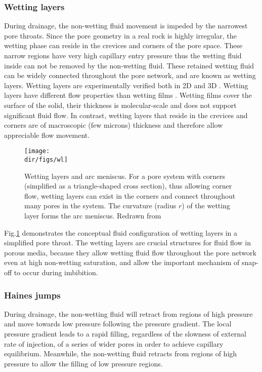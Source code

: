 \subsubsection{Wetting layers}
During drainage, the non-wetting fluid movement is impeded by the narrowest pore throats. Since the pore geometry in a real rock is highly irregular, the wetting phase can reside in the crevices and corners of the pore space. These narrow regions have very high capillary entry pressure thus the wetting fluid inside can not be removed by the non-wetting fluid. These retained wetting fluid can be widely connected throughout the pore network, and are known as wetting layers. Wetting layers are experimentally verified both in 2D and 3D \citep{datta2014mobilization, andrew2015imaging}. Wetting layers have different flow properties than wetting films \citep{blunt2017multiphase}. Wetting films cover the surface of the solid, their thickness is molecular-scale and does not support significant fluid flow. In contrast, wetting layers that reside in the crevices and corners are of macroscopic (few microns) thickness and therefore allow appreciable flow movement.

\begin{figure}[htbp]
  \centering
  \texttt{[image: \\dir/figs/wl]}
  \caption{Wetting layers and arc meniscus. For a pore system with corners (simplified as a triangle-shaped cross section), thus allowing corner flow, wetting layers can exist in the corners and connect throughout many pores in the system. The curvature (radius $r$) of the wetting layer forms the arc meniscus. Redrawn from \citet{blunt2017multiphase}}
  \label{wl}
\end{figure}

Fig.\ref{wl} demonstrates the conceptual fluid configuration of wetting layers in a simplified pore throat. The wetting layers are crucial structures for fluid flow in porous media, because they allow wetting fluid flow throughout the pore network even at high non-wetting saturation, and allow the important mechanism of snap-off to occur during imbibition.

\subsubsection{Haines jumps}
During drainage, the non-wetting fluid will retract from regions of high pressure and move towards low pressure following the pressure gradient. The local pressure gradient leads to a rapid filling, regardless of the slowness of external rate of injection, of a series of wider pores in order to achieve capillary equilibrium. Meanwhile, the non-wetting fluid retracts from regions of high pressure to allow the filling of low pressure regions.

